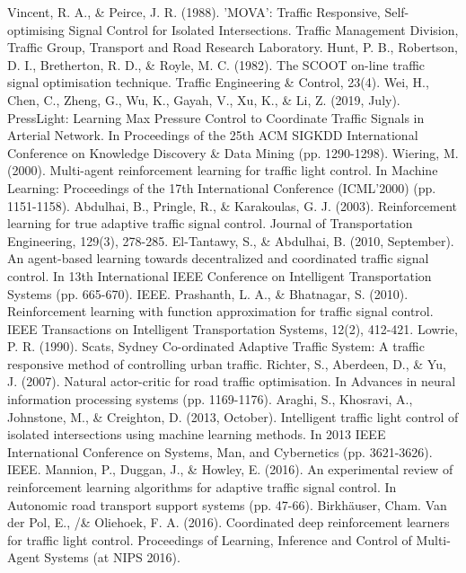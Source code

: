 \documentclass[conference]{IEEEtran}
\begin{document}
\begin{thebibliography}{00}
 Vincent, R. A., \& Peirce, J. R. (1988). 'MOVA': Traffic Responsive, Self-optimising Signal Control for Isolated Intersections. Traffic Management Division, Traffic Group, Transport and Road Research Laboratory.
 Hunt, P. B., Robertson, D. I., Bretherton, R. D., \& Royle, M. C. (1982). The SCOOT on-line traffic signal optimisation technique. Traffic Engineering \& Control, 23(4).
 Wei, H., Chen, C., Zheng, G., Wu, K., Gayah, V., Xu, K., \& Li, Z. (2019, July). PressLight: Learning Max Pressure Control to Coordinate Traffic Signals in Arterial Network. In Proceedings of the 25th ACM SIGKDD International Conference on Knowledge Discovery \& Data Mining (pp. 1290-1298).
 Wiering, M. (2000). Multi-agent reinforcement learning for traffic light control. In Machine Learning: Proceedings of the 17th International Conference (ICML'2000) (pp. 1151-1158).
 Abdulhai, B., Pringle, R., \& Karakoulas, G. J. (2003). Reinforcement learning for true adaptive traffic signal control. Journal of Transportation Engineering, 129(3), 278-285.
 El-Tantawy, S., \& Abdulhai, B. (2010, September). An agent-based learning towards decentralized and coordinated traffic signal control. In 13th International IEEE Conference on Intelligent Transportation Systems (pp. 665-670). IEEE.
 Prashanth, L. A., \& Bhatnagar, S. (2010). Reinforcement learning with function approximation for traffic signal control. IEEE Transactions on Intelligent Transportation Systems, 12(2), 412-421.
 Lowrie, P. R. (1990). Scats, Sydney Co-ordinated Adaptive Traffic System: A traffic responsive method of controlling urban traffic.
 Richter, S., Aberdeen, D., \& Yu, J. (2007). Natural actor-critic for road traffic optimisation. In Advances in neural information processing systems (pp. 1169-1176).
 Araghi, S., Khosravi, A., Johnstone, M., \& Creighton, D. (2013, October). Intelligent traffic light control of isolated intersections using machine learning methods. In 2013 IEEE International Conference on Systems, Man, and Cybernetics (pp. 3621-3626). IEEE.
 Mannion, P., Duggan, J., \& Howley, E. (2016). An experimental review of reinforcement learning algorithms for adaptive traffic signal control. In Autonomic road transport support systems (pp. 47-66). Birkhäuser, Cham.
 Van der Pol, E., /\& Oliehoek, F. A. (2016). Coordinated deep reinforcement learners for traffic light control. Proceedings of Learning, Inference and Control of Multi-Agent Systems (at NIPS 2016).

\end{thebibliography}
\end{document}
